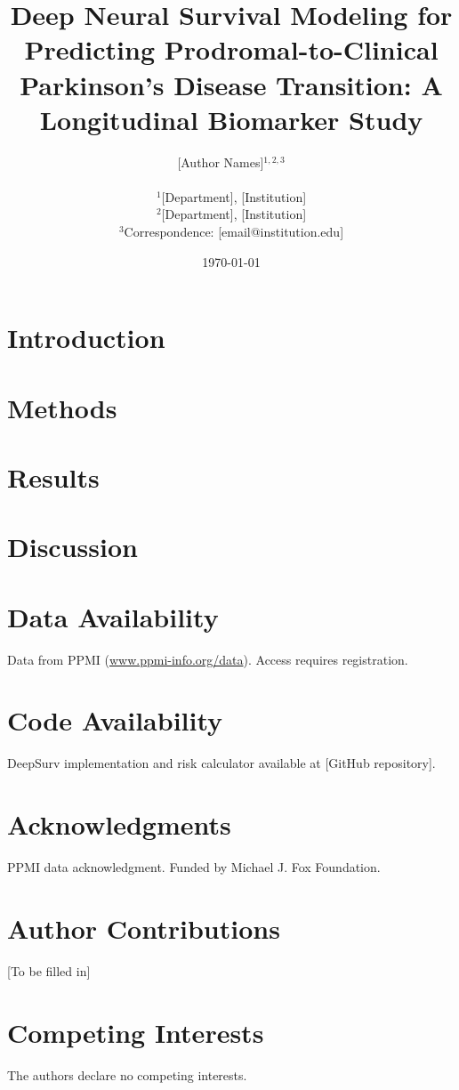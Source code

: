\documentclass[10pt]{article}
\title{\textbf{Deep Neural Survival Modeling for Predicting Prodromal-to-Clinical Parkinson's Disease Transition: A Longitudinal Biomarker Study}}
\author{
[Author Names]$^{1,2,3}$ \\
\\
\small $^1$[Department], [Institution] \\
\small $^2$[Department], [Institution] \\
\small $^3$Correspondence: [email@institution.edu]
}
\date{\today}
\begin{document}
\maketitle



\section{Introduction}


\section{Methods}


\section{Results}


\section{Discussion}


\section{Data Availability}
Data from PPMI (\url{www.ppmi-info.org/data}). Access requires registration.

\section{Code Availability}
DeepSurv implementation and risk calculator available at [GitHub repository].

\section{Acknowledgments}
PPMI data acknowledgment. Funded by Michael J. Fox Foundation.

\section{Author Contributions}
[To be filled in]

\section{Competing Interests}
The authors declare no competing interests.



\end{document}
